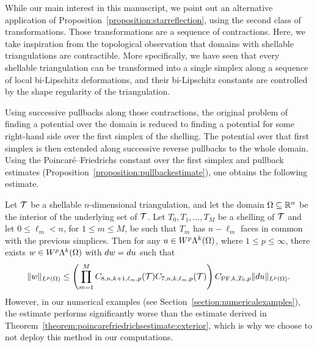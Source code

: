 \documentclass[10pt,a4paper]{article}
\begin{document}
\begin{remark}\label{remark:poincarefriedrichsestimate:exterior:contraction}
    While our main interest in this manuscript, we point out an alternative application of Proposition~\ref{proposition:starreflection},
    using the second class of transformations. 
    Those transformations are a sequence of contractions.
    Here, we take inspiration from the topological observation that domains with shellable triangulations are contractible. 
    More specifically, we have seen that every shellable triangulation can be transformed into a single simplex along a sequence of local bi-Lipschitz deformations, and their bi-Lipschitz constants are controlled by the shape regularity of the triangulation. 
    
    Using successive pullbacks along those contractions, the original problem of finding a potential over the domain is reduced to finding a potential for some right-hand side over the first simplex of the shelling. 
    The potential over that first simplex is then extended along successive reverse pullbacks to the whole domain. 
    Using the Poincar\'e--Friedrichs constant over the first simplex and pullback estimates (Proposition~\ref{proposition:pullbackestimate}),
    one obtains the following estimate.
    
    Let ${\mathcal T}$ be a shellable $n$-dimensional triangulation, and let the domain $\Omega \subseteq {\mathbb R}^{n}$ be the interior of the underlying set of ${\mathcal T}$.
    Let $T_0, T_1, \dots, T_M$ be a shelling of ${\mathcal T}$
    and let $0 \leq \ell_{m} < n$, for $1 \leq m \leq M$, be such that $T_{m}$ has $n - \ell_{m}$ faces in common with the previous simplices.
    Then for any $u \in W^{p}\Lambda^{k}(\Omega)$, where $1 \leq p \leq \infty$, 
    there exists $w \in W^{p}\Lambda^{k}(\Omega)$ with $d w = d u$ 
    such that 
    \begin{align*}
        \| w \|_{L^{p}(\Omega)}
        \leq 
        \left( 
        \prod_{m=1}^{M}
            C_{8,n,k+1,\ell_{m},p}({\mathcal T})
            C_{7,n,k  ,\ell_{m},p}({\mathcal T})
        \right)
        C_{{{\rm PF}},k,T_{0},p}
        \| d u \|_{L^{p}(\Omega)}
        .
    \end{align*}
    However, in our numerical examples (see Section~\ref{section:numericalexamples}), 
    the estimate performs significantly worse than the estimate derived in Theorem~\ref{theorem:poincarefriedrichsestimate:exterior},
    which is why we choose to not deploy this method in our computations. 
\end{remark}
\end{document}
